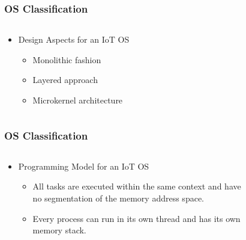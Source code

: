 \documentclass{beamer}
\begin{document}
\begin{frame}
	\frametitle{OS Classification}
	\begin{columns}[c]
		\begin{column}{30cm}
			\vspace{.1cm}
			\begin{itemize}
				\justifying
				\item Design Aspects for an IoT OS
				\begin{itemize}
					\item Monolithic fashion
					\item Layered approach
					\item Microkernel architecture
				\end{itemize}
			\end{itemize}
		\end{column}
	\end{columns}
\end{frame}

\begin{frame}
	\frametitle{OS Classification}
	\begin{columns}[c]
		\begin{column}{30cm}
			\vspace{.1cm}
			\begin{itemize}
				\justifying
				\item Programming Model for an IoT OS
				\begin{itemize}
					\item All tasks are executed within the same context and have\\
					no segmentation of the memory address space.
					\item Every process can run in its own thread and has its own\\
					memory stack.
				\end{itemize}
			\end{itemize}
		\end{column}
	\end{columns}
\end{frame}
\end{document}
